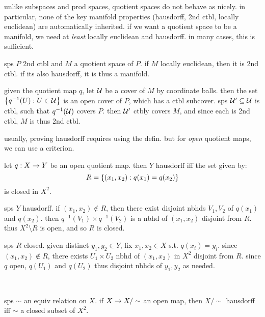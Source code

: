 unlike subspaces and prod spaces, quotient spaces do not behave as nicely. in
particular, none of the key manifold properties (hausdorff, 2nd ctbl, locally
euclidean) are automatically inherited. if we want a quotient space to be a
manifold, we need at \textit{least} locally euclidean and hausdorff. in many
cases, this is sufficient.

\begin{prop}
    sps $ P $ 2nd ctbl and $ M $ a quotient space of $ P $. if $ M $ locally
    euclidean, then it is 2nd ctbl. if its also hausdorff, it is thus a manifold.
\end{prop}

\newpage
\begin{pf}[source=Primary Source Material]
    given the quotient map $ q $, let $ \mathcal{U} $ be a cover of $ M $ by
    coordinate balls. then the set $ \left\{{q^{-1}(U):U\in\mathcal{U}}\right\} $ is an open
    cover of $ P $, which has a ctbl subcover. sps $ \mathcal{U}' \subseteq \mathcal{U} $
    is ctbl, such that $ q^{-1}(\mathcal{U}) $ covers $ P $. then $ \mathcal{U}' $ ctbly
    covers $ M $, and since each is 2nd ctbl, $ M $ is thus 2nd ctbl.
\end{pf}

usually, proving hausdorff requires using the defin. but for \textit{open}
quotient maps, we can use a criterion.

\begin{prop}
    let $ q:X\rightarrow Y $ be an open quotient map. then $ Y $ hausdorff iff the set
    given by:
    \begin{equation*}
        R=\left\{{(x_{1},x_{2}):q(x_{1})=q(x_{2})}\right\}
    \end{equation*}
    is closed in $ X^{2} $.
\end{prop}

\begin{pf}[source=Primary Source Material]
    sps $ Y $ hausdorff. if $ (x_{1},x_{2}) \notin R $, then there exist disjoint
    nbhds $ V_{1}, V_{2} $ of $ q(x_{1})$ and $q(x_{2}) $. then $ q^{-1}(V_{1})
    \times q^{-1}(V_{2}) $ is a nbhd of $ (x_{1},x_{2}) $ disjoint from $ R $.
    thus $ X^{2} \setminus R $ is open, and so $ R $ is closed.

    sps $ R $ closed. given distinct $ y_{1}, y_{2} \in Y $, fix $ x_{1},x_{2}
    \in X $ s.t. $ q(x_{i})=y_{i} $. since $ (x_{1},x_{2}) \notin R $, there
    exists $U_{1}\times U_{2}$ nbhd of $(x_{1},x_{2})$ in $X^{2}$ disjoint from
    $R$. since $q$ open, $q(U_{1})$ and $q(U_{2})$ thus disjoint nbhds of $y_{1},
    y_{2}$ as needed.
\end{pf} \

\begin{crll}
    sps $\sim$ an equiv relation on $X$. if $X\rightarrow X/\sim$ an open map, then
    $X/\sim$ hausdorff iff $\sim$ a closed subset of $X^{2}$.
\end{crll}

